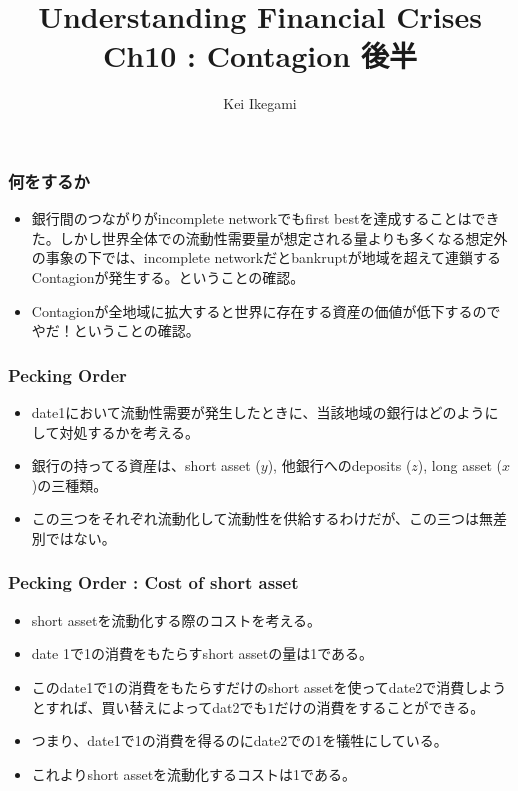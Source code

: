 \documentclass[dvipdfmx, 12pt]{beamer}
\title{Understanding Financial Crises\\Ch10 : Contagion 後半}
\author{Kei Ikegami}
\begin{document}
\newcommand{\argmin}{\mathop{\rm arg~min}\limits}

\frame{\maketitle}

\begin{frame}\frametitle{何をするか}
	\begin{itemize}
	\item 銀行間のつながりがincomplete networkでもfirst bestを達成することはできた。しかし世界全体での流動性需要量が想定される量よりも多くなる想定外の事象の下では、incomplete networkだとbankruptが地域を超えて連鎖するContagionが発生する。ということの確認。
	\item Contagionが全地域に拡大すると世界に存在する資産の価値が低下するのでやだ！ということの確認。
	\end{itemize}
\end{frame}

\begin{frame}\frametitle{Pecking Order}
	\begin{itemize}
	\item date1において流動性需要が発生したときに、当該地域の銀行はどのようにして対処するかを考える。
	\item 銀行の持ってる資産は、short asset ($y$), 他銀行へのdeposits ($z$), long asset ($x$)の三種類。
	\item この三つをそれぞれ流動化して流動性を供給するわけだが、この三つは無差別ではない。
	\end{itemize}
\end{frame}

\begin{frame}\frametitle{Pecking Order : Cost of short asset}
	\begin{itemize}
	\item short assetを流動化する際のコストを考える。
	\item date 1で1の消費をもたらすshort assetの量は1である。
	\item このdate1で1の消費をもたらすだけのshort assetを使ってdate2で消費しようとすれば、買い替えによってdat2でも1だけの消費をすることができる。
	\item つまり、date1で1の消費を得るのにdate2での1を犠牲にしている。
	\item これよりshort assetを流動化するコストは1である。
	\end{itemize}
\end{frame}
\end{document}
